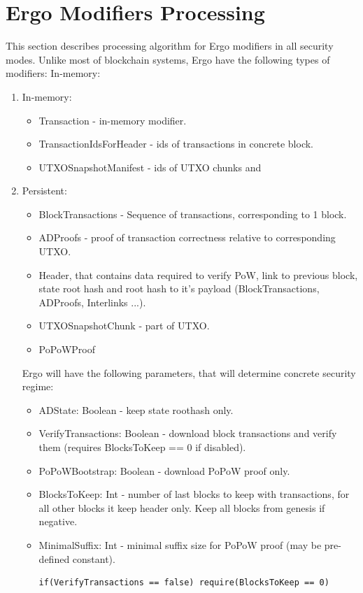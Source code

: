 \documentclass[]{article}   %
\begin{document}
\section{Ergo Modifiers Processing}
This section describes processing algorithm for Ergo modifiers in all security modes. Unlike most of blockchain systems, Ergo have the following types of modifiers: In-memory:
\begin{enumerate}
\item In-memory:
\begin{itemize}
\item Transaction - in-memory modifier.
\item TransactionIdsForHeader - ids of transactions in concrete block.
\item UTXOSnapshotManifest - ids of UTXO chunks and
\end{itemize}
\item Persistent:
\begin{itemize}
\item BlockTransactions - Sequence of transactions, corresponding to 1 block.
\item ADProofs - proof of transaction correctness relative to corresponding UTXO.
\item Header, that contains data required to verify PoW, link to previous block, state root hash and root hash to it's payload (BlockTransactions, ADProofs, Interlinks ...).
\item UTXOSnapshotChunk - part of UTXO.
\item PoPoWProof
\end{itemize}
Ergo will have the following parameters, that will determine concrete security regime:
\begin{itemize}
\item ADState: Boolean - keep state roothash only.
\item VerifyTransactions: Boolean - download block transactions and verify them (requires BlocksToKeep == 0 if disabled).
\item PoPoWBootstrap: Boolean - download PoPoW proof only.
\item BlocksToKeep: Int - number of last blocks to keep with transactions, for all other blocks it keep header only. Keep all blocks from genesis if negative.
\item MinimalSuffix: Int - minimal suffix size for PoPoW proof (may be pre-defined constant).
\begin{verbatim}
if(VerifyTransactions == false) require(BlocksToKeep == 0)
\end{verbatim}

\end{itemize}
\end{enumerate}
\end{document}
